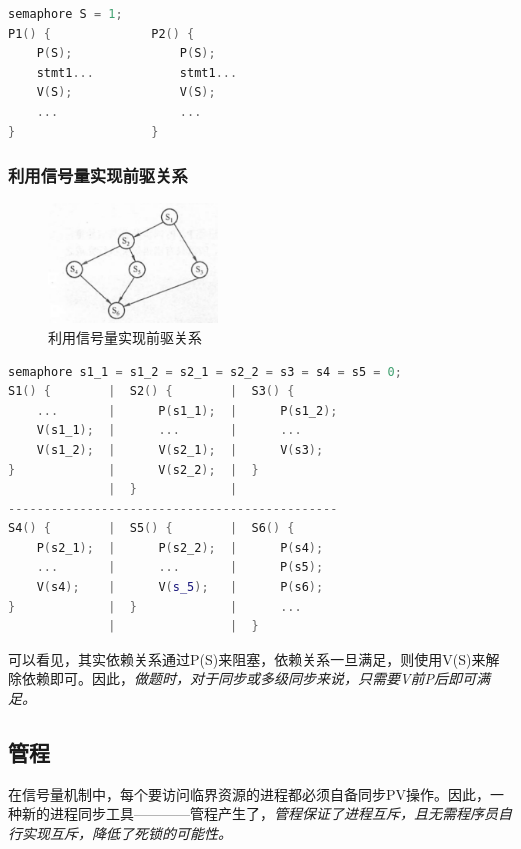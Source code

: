 \begin{lstlisting}[language=C++]
semaphore S = 1;
P1() {              P2() {
    P(S);               P(S);
    stmt1...            stmt1...
    V(S);               V(S);
    ...                 ...
}                   }
\end{lstlisting}

\subsubsection{利用信号量实现前驱关系}

\begin{figure}[!htbp]
    \centering
    \includegraphics[width=0.4\textwidth]{image/chapter02/利用信号量实现前驱.png}
    \caption{利用信号量实现前驱关系}
\end{figure}

\begin{lstlisting}[language=C++]
semaphore s1_1 = s1_2 = s2_1 = s2_2 = s3 = s4 = s5 = 0;
S1() {        |  S2() {        |  S3() {
    ...       |      P(s1_1);  |      P(s1_2);
    V(s1_1);  |      ...       |      ...
    V(s1_2);  |      V(s2_1);  |      V(s3);
}             |      V(s2_2);  |  }
              |  }             |
----------------------------------------------
S4() {        |  S5() {        |  S6() {
    P(s2_1);  |      P(s2_2);  |      P(s4);
    ...       |      ...       |      P(s5);
    V(s4);    |      V(s_5);   |      P(s6);
}             |  }             |      ...
              |                |  }
\end{lstlisting}

    可以看见，其实依赖关系通过P(S)来阻塞，依赖关系一旦满足，则使用V(S)来解除依赖即可。因此，\emph{做题时，对于同步或多级同步来说，只需要V前P后即可满足。}

\subsection{管程}

    在信号量机制中，每个要访问临界资源的进程都必须自备同步PV操作。因此，一种新的进程同步工具————管程产生了，\emph{管程保证了进程互斥，且无需程序员自行实现互斥，降低了死锁的可能性。}

